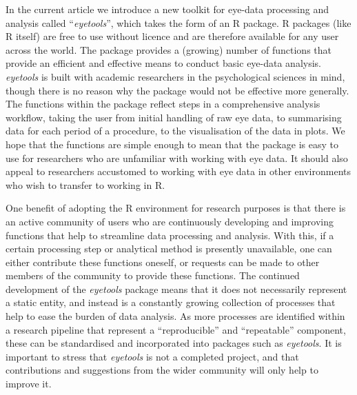 \documentclass[
  man,
  floatsintext,
  longtable,
  nolmodern,
  notxfonts,
  notimes,
  colorlinks=true,linkcolor=blue,citecolor=blue,urlcolor=blue]{apa7}
\begin{document}
In the current article we introduce a new toolkit for eye-data
processing and analysis called ``\emph{eyetools}'', which takes the form
of an R package. R packages (like R itself) are free to use without
licence and are therefore available for any user across the world. The
package provides a (growing) number of functions that provide an
efficient and effective means to conduct basic eye-data analysis.
\emph{eyetools} is built with academic researchers in the psychological
sciences in mind, though there is no reason why the package would not be
effective more generally. The functions within the package reflect steps
in a comprehensive analysis workflow, taking the user from initial
handling of raw eye data, to summarising data for each period of a
procedure, to the visualisation of the data in plots. We hope that the
functions are simple enough to mean that the package is easy to use for
researchers who are unfamiliar with working with eye data. It should
also appeal to researchers accustomed to working with eye data in other
environments who wish to transfer to working in R.

One benefit of adopting the R environment for research purposes is that
there is an active community of users who are continuously developing
and improving functions that help to streamline data processing and
analysis. With this, if a certain processing step or analytical method
is presently unavailable, one can either contribute these functions
oneself, or requests can be made to other members of the community to
provide these functions. The continued development of the
\emph{eyetools} package means that it does not necessarily represent a
static entity, and instead is a constantly growing collection of
processes that help to ease the burden of data analysis. As more
processes are identified within a research pipeline that represent a
``reproducible'' and ``repeatable'' component, these can be standardised
and incorporated into packages such as \emph{eyetools}. It is important
to stress that \emph{eyetools} is not a completed project, and that
contributions and suggestions from the wider community will only help to
improve it.
\end{document}
